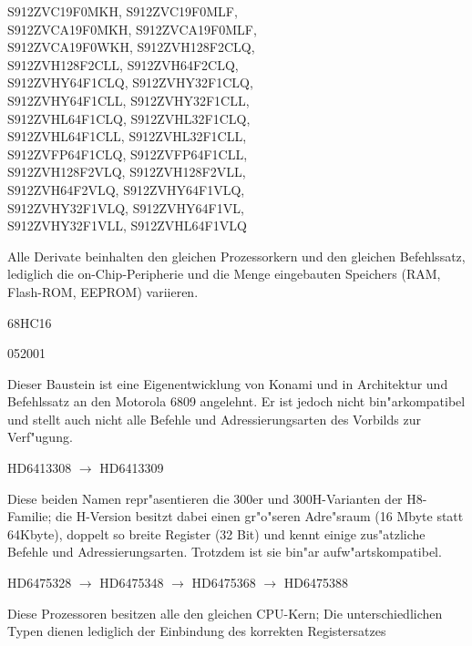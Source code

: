 \documentclass[12pt,a4paper,twoside]{report}
\begin{document}
\begin{cpulist}
   S912ZVC19F0MKH, S912ZVC19F0MLF,\\
\> S912ZVCA19F0MKH, S912ZVCA19F0MLF,\\
\> S912ZVCA19F0WKH, S912ZVH128F2CLQ,\\
\> S912ZVH128F2CLL, S912ZVH64F2CLQ,\\
\> S912ZVHY64F1CLQ, S912ZVHY32F1CLQ,\\
\> S912ZVHY64F1CLL, S912ZVHY32F1CLL,\\
\> S912ZVHL64F1CLQ, S912ZVHL32F1CLQ,\\
\> S912ZVHL64F1CLL, S912ZVHL32F1CLL,\\
\> S912ZVFP64F1CLQ, S912ZVFP64F1CLL,\\
\> S912ZVH128F2VLQ, S912ZVH128F2VLL,\\
\> S912ZVH64F2VLQ, S912ZVHY64F1VLQ,\\
\> S912ZVHY32F1VLQ, S912ZVHY64F1VL,\\
\> S912ZVHY32F1VLL, S912ZVHL64F1VLQ
\end{cpulist}
Alle Derivate beinhalten den gleichen Prozessorkern und den
gleichen Befehlssatz, lediglich die on-Chip-Peripherie und
die Menge eingebauten Speichers (RAM, Flash-ROM, EEPROM)
variieren.
\begin{cpulist}
   68HC16
\end{cpulist}
\begin{cpulist}
   052001
\end{cpulist}
Dieser Baustein ist eine Eigenentwicklung von Konami und in
Architektur und Befehlssatz an den Motorola 6809 angelehnt.
Er ist jedoch nicht bin"arkompatibel und stellt auch nicht
alle Befehle und Adressierungsarten des Vorbilds zur Verf"ugung.
\begin{cpulist}
   HD6413308 $\longrightarrow$ HD6413309
\end{cpulist}
Diese beiden Namen repr"asentieren die 300er und 300H-Varianten der
H8-Familie; die H-Version besitzt dabei einen gr"o"seren Adre"sraum
(16 Mbyte statt 64Kbyte), doppelt so breite Register (32 Bit) und
kennt einige zus"atzliche Befehle und Adressierungsarten.  Trotzdem
ist sie bin"ar aufw"artskompatibel.
\begin{cpulist}
   HD6475328 $\longrightarrow$ HD6475348 $\longrightarrow$
   HD6475368 $\longrightarrow$ HD6475388
\end{cpulist}
Diese Prozessoren besitzen alle den gleichen CPU-Kern; Die unterschiedlichen
Typen dienen lediglich der Einbindung des korrekten Registersatzes
\end{document}
